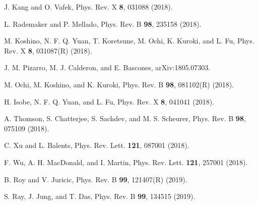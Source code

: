 \documentclass[aps,prl,reprint,amssymb,groupedaddress,twocolumn]{revtex4}
\begin{document}
\begin{thebibliography}{99}
	J. Kang and O. Vafek,
	Phys. Rev. X \textbf{8}, 031088 (2018).
	
	L. Rademaker and P. Mellado,
	Phys. Rev. B \textbf{98}, 235158 (2018).
	
	M. Koshino, N. F. Q. Yuan, T. Koretsune, M. Ochi, K. Kuroki, and L. Fu,
	Phys. Rev. X \textbf{8}, 031087(R) (2018).
	
	J. M. Pizarro, M. J. Calderon, and E. Bascones,
	arXiv:1805.07303.
	
	M. Ochi, M. Koshino, and K. Kuroki,
	Phys. Rev. B \textbf{98}, 081102(R) (2018).
	
	H. Isobe, N. F. Q. Yuan, and L. Fu,
	Phys. Rev. X \textbf{8}, 041041 (2018).
	
	A. Thomson, S. Chatterjee, S. Sachdev, and  M. S. Scheurer,
	Phys. Rev. B \textbf{98}, 075109 (2018).
	
	C. Xu and L. Balents,
	Phys. Rev. Lett. \textbf{121}, 087001 (2018).
	
	F. Wu, A. H. MacDonald, and I. Martin,
	Phys. Rev. Lett. \textbf{121}, 257001 (2018).
	
	B. Roy and V. Juricic,
	Phys. Rev. B  \textbf{99},  121407(R) (2019).
	
	S. Ray, J. Jung, and T. Das,
	Phys. Rev. B \textbf{99}, 134515 (2019).
	

\end{thebibliography}
\end{document}
